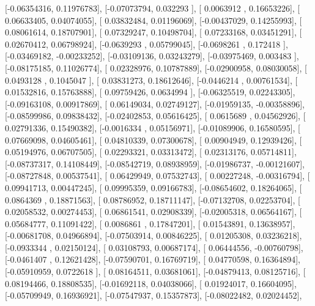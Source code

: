 \documentclass{article}
\begin{document}
       [-0.06354316,  0.11976783],
       [-0.07073794,  0.032293  ],
       [ 0.0063912 ,  0.16653226],
       [ 0.06633405,  0.04074055],
       [ 0.03832484,  0.01196069],
       [-0.00437029,  0.14255993],
       [ 0.08061614,  0.18707901],
       [ 0.07329247,  0.10498704],
       [ 0.07233168,  0.03451291],
       [ 0.02670412,  0.06798924],
       [-0.0639293 ,  0.05799045],
       [-0.0698261 ,  0.172418  ],
       [-0.03469182, -0.00233252],
       [-0.03109136,  0.03243279],
       [-0.03975469,  0.003483  ],
       [-0.08175185,  0.11026774],
       [ 0.02328976,  0.10787889],
       [-0.02900958,  0.08030058],
       [ 0.0493128 ,  0.1045047 ],
       [ 0.03831273,  0.18612646],
       [-0.0446214 ,  0.00761534],
       [ 0.01532816,  0.15763888],
       [ 0.09759426,  0.0634994 ],
       [-0.06325519,  0.02243305],
       [-0.09163108,  0.00917869],
       [ 0.06149034,  0.02749127],
       [-0.01959135, -0.00358896],
       [-0.08599986,  0.09838432],
       [-0.02402853,  0.05616425],
       [ 0.0615689 ,  0.04562926],
       [ 0.02791336,  0.15490382],
       [-0.0016334 ,  0.05156971],
       [-0.01089906,  0.16580595],
       [ 0.07669098,  0.04605461],
       [ 0.04810339,  0.07300678],
       [ 0.00904949,  0.12939426],
       [ 0.05194976,  0.06707505],
       [ 0.02293321,  0.03313472],
       [ 0.02313176,  0.05714811],
       [-0.08737317,  0.14108449],
       [-0.08542719,  0.08938959],
       [-0.01986737, -0.00121607],
       [-0.08727848,  0.00537541],
       [ 0.06429949,  0.07532743],
       [ 0.00227248, -0.00316794],
       [ 0.09941713,  0.00447245],
       [ 0.09995359,  0.09166783],
       [-0.08654602,  0.18264065],
       [ 0.0864369 ,  0.18871563],
       [ 0.08786952,  0.18711147],
       [-0.07132708,  0.02253704],
       [ 0.02058532,  0.00274453],
       [ 0.06861541,  0.02908339],
       [-0.02005318,  0.06564167],
       [ 0.05684777,  0.11091422],
       [ 0.0086861 ,  0.17847201],
       [ 0.01543891,  0.13638957],
       [-0.00681708,  0.04966894],
       [-0.07503914,  0.00846225],
       [ 0.01205308,  0.03236218],
       [-0.0933344 ,  0.02150124],
       [ 0.03108793,  0.00687174],
       [ 0.06444556, -0.00760798],
       [-0.0461407 ,  0.12621428],
       [-0.07590701,  0.16769719],
       [ 0.04770598,  0.16364894],
       [-0.05910959,  0.0722618 ],
       [ 0.08164511,  0.03681061],
       [-0.04879413,  0.08125716],
       [ 0.08194466,  0.18808535],
       [-0.01692118,  0.04038066],
       [ 0.01924017,  0.16604095],
       [-0.05709949,  0.16936921],
       [-0.07547937,  0.15357873],
       [-0.08022482,  0.02024452],
\end{document}
